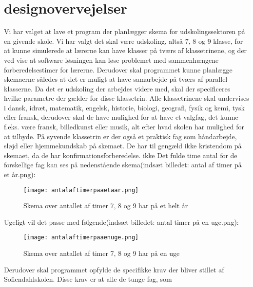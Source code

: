 \documentclass{article}
\begin{document}
\section{designovervejelser}
Vi har valget at lave et program der planlægger skema for udskolingssektoren på en givende skole. Vi har valgt det skal være udskoling, altså 7, 8 og 9 klasse, for at kunne simulerede at lærerne kan have klasser på tværs af klassetrinene, og der ved vise at software løsningen kan løse problemet med sammenhængene forberedelsestimer for lærerne. Derudover skal programmet kunne planlægge skemaerne således at det er muligt at have samarbejde på tværs af parallel klasserne.  Da det er udskoling der arbejdes videre med, skal der specificeres hvilke parametre der gælder for disse klassetrin. Alle klassetrinene skal undervises i dansk, idræt, matematik, engelsk, historie, biologi, geografi, fysik og kemi, tysk eller fransk, derudover skal de have mulighed for at have et valgfag, det kunne f.eks. være fransk, billedkunst eller musik, alt efter hvad skolen har mulighed for at tilbyde. På syvende klassetrin er der også et praktisk fag som håndarbejde, sløjd eller hjemmekundskab på skemaet. De har til gengæld ikke kristendom på skemaet, da de har konfirmationsforberedelse. ikke Det fulde time antal for de forskellige fag kan ses på nedenstående skema(indsæt billedet: antal af timer på et år.png):
\begin{figure}[h!]
\texttt{[image: antalaftimerpaaetaar.png]}
\caption{Skema over antallet af timer 7, 8 og 9 har på et helt år}
\label{Fig: XXX}
\end{figure}

Ugeligt vil det passe med følgende(indsæt billedet: antal timer på en uge.png):
\begin{figure}[h!]
\texttt{[image: antalaftimerpaaenuge.png]}
\caption{Skema over antallet af timer 7, 8 og 9 har på en uge}
\label{Fig: XXX2}
\end{figure}

Derudover skal programmet opfylde de specifikke krav der bliver stillet af Sofiendahlskolen. Disse krav er at alle de tunge fag, som 
\end{document}
